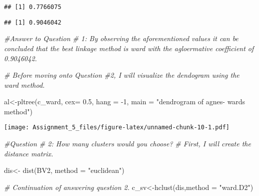 \documentclass[
]{article}
\newenvironment{Shaded}{\begin{snugshade}}{\end{snugshade}}
\newcommand{\AttributeTok}[1]{\textcolor[rgb]{0.77,0.63,0.00}{#1}}
\newcommand{\CommentTok}[1]{\textcolor[rgb]{0.56,0.35,0.01}{\textit{#1}}}
\newcommand{\DecValTok}[1]{\textcolor[rgb]{0.00,0.00,0.81}{#1}}
\newcommand{\FloatTok}[1]{\textcolor[rgb]{0.00,0.00,0.81}{#1}}
\newcommand{\FunctionTok}[1]{\textcolor[rgb]{0.00,0.00,0.00}{#1}}
\newcommand{\NormalTok}[1]{#1}
\newcommand{\OtherTok}[1]{\textcolor[rgb]{0.56,0.35,0.01}{#1}}
\newcommand{\SpecialCharTok}[1]{\textcolor[rgb]{0.00,0.00,0.00}{#1}}
\newcommand{\StringTok}[1]{\textcolor[rgb]{0.31,0.60,0.02}{#1}}
\begin{document}
\begin{verbatim}
## [1] 0.7766075
\end{verbatim}

\begin{Shaded}
\end{Shaded}

\begin{verbatim}
## [1] 0.9046042
\end{verbatim}

\begin{Shaded}
\begin{Highlighting}[]
\CommentTok{\#Answer to Question \# 1: By observing the aforementioned values it can be concluded that the best linkage method is ward with the agloermative coefficient of 0.9046042.}
\end{Highlighting}
\end{Shaded}

\begin{Shaded}
\begin{Highlighting}[]
\CommentTok{\# Before moving onto Question \#2, I will visualize the dendogram using the ward method. }

\NormalTok{al}\OtherTok{\textless{}{-}}\FunctionTok{pltree}\NormalTok{(c\_ward, }\AttributeTok{cex=} \FloatTok{0.5}\NormalTok{, }\AttributeTok{hang =} \SpecialCharTok{{-}}\DecValTok{1}\NormalTok{, }\AttributeTok{main =} \StringTok{"dendrogram of agnes{-} wards method"}\NormalTok{)}
\end{Highlighting}
\end{Shaded}

\texttt{[image: Assignment\_5\_files/figure-latex/unnamed-chunk-10-1.pdf]}

\begin{Shaded}
\begin{Highlighting}[]
\CommentTok{\#Question \# 2: How many clusters would you choose? }
\CommentTok{\# First, I will create the distance matrix. }

\NormalTok{dis}\OtherTok{\textless{}{-}} \FunctionTok{dist}\NormalTok{(BV2, }\AttributeTok{method =} \StringTok{"euclidean"}\NormalTok{)}
\end{Highlighting}
\end{Shaded}

\begin{Shaded}
\begin{Highlighting}[]
\CommentTok{\# Continuation of answering question 2. }
\NormalTok{c\_sv}\OtherTok{\textless{}{-}}\FunctionTok{hclust}\NormalTok{(dis,}\AttributeTok{method =} \StringTok{"ward.D2"}\NormalTok{)}
\end{Highlighting}
\end{Shaded}
\end{document}
